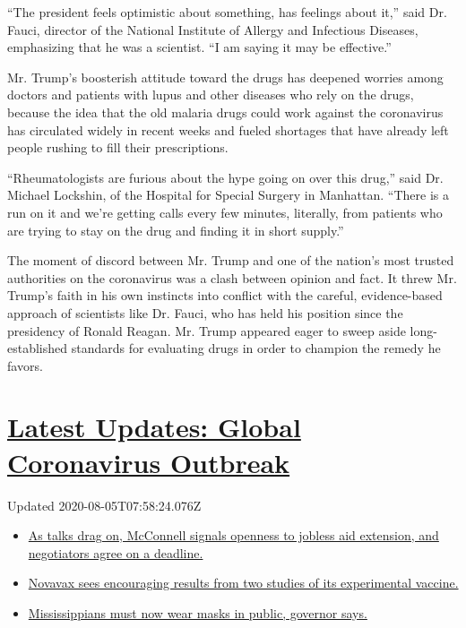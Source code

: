 ``The president feels optimistic about something, has feelings about
it,'' said Dr. Fauci, director of the National Institute of Allergy and
Infectious Diseases, emphasizing that he was a scientist. ``I am saying
it may be effective.''

Mr. Trump's boosterish attitude toward the drugs has deepened worries
among doctors and patients with lupus and other diseases who rely on the
drugs, because the idea that the old malaria drugs could work against
the coronavirus has circulated widely in recent weeks and fueled
shortages that have already left people rushing to fill their
prescriptions.

``Rheumatologists are furious about the hype going on over this drug,''
said Dr. Michael Lockshin, of the Hospital for Special Surgery in
Manhattan. ``There is a run on it and we're getting calls every few
minutes, literally, from patients who are trying to stay on the drug and
finding it in short supply.''

The moment of discord between Mr. Trump and one of the nation's most
trusted authorities on the coronavirus was a clash between opinion and
fact. It threw Mr. Trump's faith in his own instincts into conflict with
the careful, evidence-based approach of scientists like Dr. Fauci, who
has held his position since the presidency of Ronald Reagan. Mr. Trump
appeared eager to sweep aside long-established standards for evaluating
drugs in order to champion the remedy he favors.

\hypertarget{latest-updates-global-coronavirus-outbreak}{%
\section{\texorpdfstring{\href{https://www.nytimes3xbfgragh.onion/2020/08/04/world/coronavirus-cases.html?action=click\&pgtype=Article\&state=default\&region=MAIN_CONTENT_1\&context=storylines_live_updates}{Latest
Updates: Global Coronavirus
Outbreak}}{Latest Updates: Global Coronavirus Outbreak}}\label{latest-updates-global-coronavirus-outbreak}}

Updated 2020-08-05T07:58:24.076Z

\begin{itemize}
\tightlist
\item
  \href{https://www.nytimes3xbfgragh.onion/2020/08/04/world/coronavirus-cases.html?action=click\&pgtype=Article\&state=default\&region=MAIN_CONTENT_1\&context=storylines_live_updates\#link-762df92}{As
  talks drag on, McConnell signals openness to jobless aid extension,
  and negotiators agree on a deadline.}
\item
  \href{https://www.nytimes3xbfgragh.onion/2020/08/04/world/coronavirus-cases.html?action=click\&pgtype=Article\&state=default\&region=MAIN_CONTENT_1\&context=storylines_live_updates\#link-1228a480}{Novavax
  sees encouraging results from two studies of its experimental
  vaccine.}
\item
  \href{https://www.nytimes3xbfgragh.onion/2020/08/04/world/coronavirus-cases.html?action=click\&pgtype=Article\&state=default\&region=MAIN_CONTENT_1\&context=storylines_live_updates\#link-794484ed}{Mississippians
  must now wear masks in public, governor says.}
\end{itemize}

